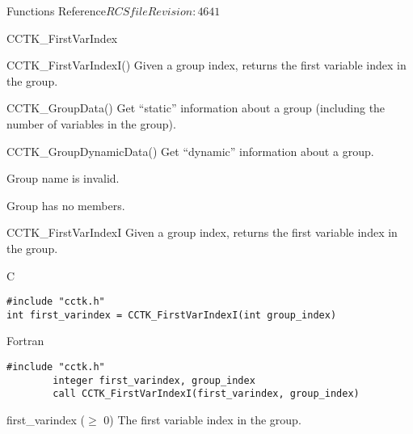 \begin{cactuspart}{ Functions Reference}{$RCSfile$}{$Revision: 4641 $}
\begin{FunctionDescription}{CCTK\_FirstVarIndex}
\begin{SeeAlsoSection}
\begin{SeeAlso}{CCTK\_FirstVarIndexI()}
Given a group index, returns the first variable index in the group.
\end{SeeAlso}
\begin{SeeAlso}{CCTK\_GroupData()}
Get ``static'' information about a group
(including the number of variables in the group).
\end{SeeAlso}
\begin{SeeAlso}{CCTK\_GroupDynamicData()}
Get ``dynamic'' information about a group.
\end{SeeAlso}
\end{SeeAlsoSection}

\begin{ErrorSection}
\begin{Error}{-1}
Group name is invalid.
\end{Error}
\begin{Error}{-2}
Group has no members.
\end{Error}
\end{ErrorSection}
\end{FunctionDescription}


\begin{FunctionDescription}{CCTK\_FirstVarIndexI}
\label{CCTK-FirstVarIndexI}
Given a group index, returns the first variable index in the group.

\begin{SynopsisSection}
\begin{Synopsis}{C}
\begin{verbatim}
#include "cctk.h"
int first_varindex = CCTK_FirstVarIndexI(int group_index)
\end{verbatim}
\end{Synopsis}
\begin{Synopsis}{Fortran}
\begin{verbatim}
#include "cctk.h"
        integer first_varindex, group_index
        call CCTK_FirstVarIndexI(first_varindex, group_index)
\end{verbatim}
\end{Synopsis}
\end{SynopsisSection}

\begin{ResultSection}
\begin{Result}{first\_varindex ($\ge$ 0)}
The first variable index in the group.
\end{Result}
\end{ResultSection}


\end{FunctionDescription}
\end{cactuspart}
